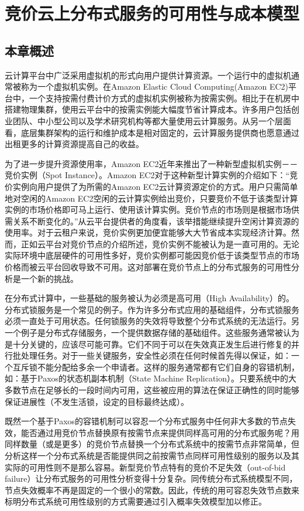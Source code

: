 \chapter{竞价云上分布式服务的可用性与成本模型}
\label{cha:jupiter}

\section{本章概述}
\label{sec:jupiter_intro}
云计算平台中广泛采用虚拟机的形式向用户提供计算资源。一个运行中的虚拟机通常被称为一个虚拟机实例。在Amazon Elastic Cloud Computing(Amazon EC2)平台中，一个支持按需付费计价方式的虚拟机实例被称为按需实例。相比于在机房中搭建物理集群，使用云平台中的按需实例能大幅度节省计算成本。许多用户包括创业团队、中小型公司以及学术研究机构等都大量使用云计算服务。从另一个层面看，底层集群架构的运行和维护成本是相对固定的，云计算服务提供商也愿意通过出租更多的计算资源提高自己的收益。

为了进一步提升资源使用率，Amazon EC2近年来推出了一种新型虚拟机实例－－竞价实例（Spot Instance）。Amazon EC2对于这种新型计算实例的介绍如下：``竞价实例向用户提供了为所需的Amazon EC2云计算资源定价的方式。用户只需简单地对空闲的Amazon EC2空闲的云计算实例给出竞价，只要竞价不低于该类型计算实例的市场价格即可马上运行、使用该计算实例。竞价节点的市场则是根据市场供需关系不断变化的。''从云平台提供者的角度看，该举措能继续提升空闲计算资源的使用率。对于云租户来说，竞价实例更加便宜能够大大节省成本实现经济计算。然而，正如云平台对竞价节点的介绍所述，竞价实例不能被认为是一直可用的。无论实际环境中底层硬件的可用性多好，竞价实例都可能因竞价低于该类型节点的市场价格而被云平台回收导致不可用。这对部署在竞价节点上的分布式服务的可用性分析是一个新的挑战。

在分布式计算中，一些基础的服务被认为必须是高可用（High Availability）的。分布式锁服务是一个常见的例子。作为许多分布式应用的基础组件，分布式锁服务必须一直处于可用状态。任何锁服务的失效将导致整个分布式系统的无法运行。另一个例子是分布式存储服务，一个提供数据存储的基础组件。这些服务通常被认为是十分关键的，应该尽可能可靠。它们不同于可以在失效真正发生后进行修复的并行批处理任务\cite{Liu:2011:CMC:2170444.2170450, 5975137, Yi:2010:RCS:1844768.1845343}。对于一些关键服务，安全性必须在任何时候首先得以保证，如：一个互斥锁不能分配给多余一个申请者。这样的服务通常都有它们自身的容错机制，如：基于Paxos的状态机副本机制（State Machine Replication）。只要系统中的大多数节点在足够长的一段时间内可用，这些被应用的算法在保证正确性的同时能够保证进展性（不发生活锁，设定的目标最终达成）。

既然一个基于Paxos的容错机制可以容忍一个分布式服务中任何非大多数的节点失效，能否通过用竞价节点替换原有按需节点来提供同样高可用的分布式服务呢？用同样数量（或是更多）的竞价节点替换一个分布式系统中的按需节点非常简单，但分析这样一个分布式系统是否能提供同之前按需节点同样可用性级别的服务以及其实际的可用性则不是那么容易。新型竞价节点特有的竞价不足失效（out-of-bid failure）让分布式服务的可用性分析变得十分复杂。同传统分布式系统模型不同，节点失效概率不再是固定的一个很小的常数。因此，传统的用可容忍失效节点数来标明分布式系统可用性级别的方式需要通过引入概率失效模型加以修正。

